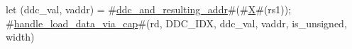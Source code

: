 let (ddc_val, vaddr) = #\hyperref[sailRISCVzddczyandzyresultingzyaddr]{ddc\_and\_resulting\_addr}#(#\hyperref[sailRISCVzX]{X}#(rs1));
#\hyperref[sailRISCVzhandlezyloadzydatazyviazycap]{handle\_load\_data\_via\_cap}#(rd, DDC_IDX, ddc_val, vaddr, is_unsigned, width)

